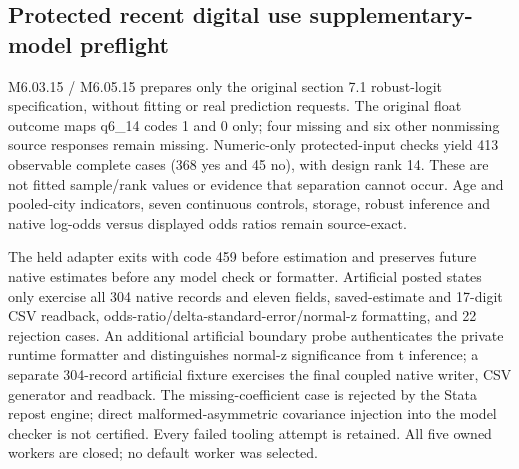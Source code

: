 \documentclass[11pt,a4paper]{article}
\begin{document}
\subsection*{Protected recent digital use supplementary-model preflight}
M6.03.15 / M6.05.15 prepares only the original section 7.1 robust-logit specification, without fitting or real prediction requests. The original float outcome maps q6\_14 codes 1 and 0 only; four missing and six other nonmissing source responses remain missing. Numeric-only protected-input checks yield 413 observable complete cases (368 yes and 45 no), with design rank 14. These are not fitted sample/rank values or evidence that separation cannot occur. Age and pooled-city indicators, seven continuous controls, storage, robust inference and native log-odds versus displayed odds ratios remain source-exact.

The held adapter exits with code 459 before estimation and preserves future native estimates before any model check or formatter. Artificial posted states only exercise all 304 native records and eleven fields, saved-estimate and 17-digit CSV readback, odds-ratio/delta-standard-error/normal-z formatting, and 22 rejection cases. An additional artificial boundary probe authenticates the private runtime formatter and distinguishes normal-z significance from t inference; a separate 304-record artificial fixture exercises the final coupled native writer, CSV generator and readback. The missing-coefficient case is rejected by the Stata repost engine; direct malformed-asymmetric covariance injection into the model checker is not certified. Every failed tooling attempt is retained. All five owned workers are closed; no default worker was selected.
\end{document}
